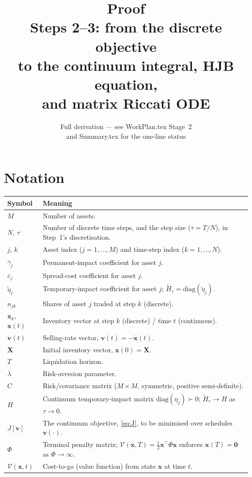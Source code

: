 \documentclass[11pt,a4paper]{article}
\title{\textbf{Proof} \\ \large Steps 2--3: from the discrete objective\\
to the continuum integral, HJB equation,\\and matrix Riccati ODE}
\author{Full derivation --- see WorkPlan.tex Stage~2\\
and Summary.tex for the one-line status}
\date{}
\begin{document}
\maketitle

\section*{Notation}

\begin{center}
\begin{tabular}{@{}L{2.1cm}L{12.5cm}@{}}
\toprule
\textbf{Symbol} & \textbf{Meaning} \\
\midrule
$M$ & Number of assets. \\
$N$, $\tau$ & Number of discrete time steps, and the step size ($\tau=T/N$), in Step~1's discretisation. \\
$j$, $k$ & Asset index ($j=1,\dots,M$) and time-step index ($k=1,\dots,N$). \\
$\gamma_j$ & Permanent-impact coefficient for asset $j$. \\
$\varepsilon_j$ & Spread-cost coefficient for asset $j$. \\
$\tilde\eta_j$ & Temporary-impact coefficient for asset $j$; $\widetilde H_\tau=\mathrm{diag}(\tilde\eta_j)$. \\
$n_{jk}$ & Shares of asset $j$ traded at step $k$ (discrete). \\
$\mathbf x_k$, $\mathbf x(t)$ & Inventory vector at step $k$ (discrete) / time $t$ (continuous). \\
$\mathbf v(t)$ & Selling-rate vector, $\mathbf v(t)=-\dot{\mathbf x}(t)$. \\
$\mathbf X$ & Initial inventory vector, $\mathbf x(0)=\mathbf X$. \\
$T$ & Liquidation horizon. \\
$\lambda$ & Risk-aversion parameter. \\
$C$ & Risk/covariance matrix ($M\times M$, symmetric, positive semi-definite). \\
$H$ & Continuum temporary-impact matrix $\mathrm{diag}(\eta_j)\succ0$; $\widetilde H_\tau\to H$ as $\tau\to0$. \\
$J[\mathbf v]$ & The continuum objective, \eqref{eq:J}, to be minimised over schedules $\mathbf v(\cdot)$. \\
$\Phi$ & Terminal penalty matrix; $\mathcal V(\mathbf x,T)=\tfrac12\mathbf x^\top\Phi\mathbf x$ enforces $\mathbf x(T)=\mathbf 0$ as $\Phi\to\infty$. \\
$\mathcal V(\mathbf x,t)$ & Cost-to-go (value function) from state $\mathbf x$ at time $t$. \\

\end{tabular}
\end{center}
\end{document}
